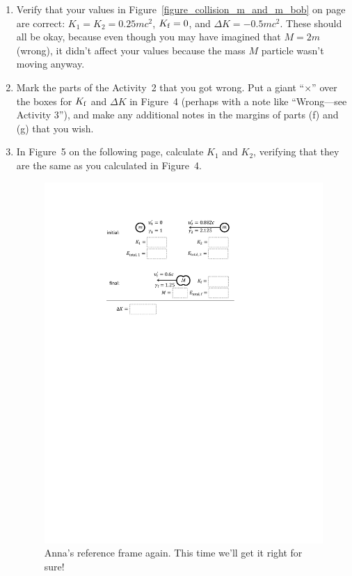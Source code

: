\begin{enumerate}[labparts]

\item Verify that your values in Figure~\ref{figure_collision_m_and_m_bob} on page~\pageref{figure_collision_m_and_m_bob} are correct: $K_1=K_2=0.25mc^2$, $K_{\rm f}=0$, and $\Delta K = -0.5mc^2$.  These should all be okay, because even though you may have imagined that $M=2m$ (wrong), it didn't affect your values because the mass $M$ particle wasn't moving anyway.


\item Mark the parts of the Activity~2 that you got wrong.  Put a giant ``{\Large {$\times$}}'' over the boxes for $K_{\rm f}$ and $\Delta K$ in Figure~4 (perhaps with a note like ``Wrong---see Activity 3''), and make any additional notes in the margins of parts (f) and (g) that you wish.


\item In Figure~5 on the following page, calculate $K_1$ and $K_2$, verifying that they are the same as you calculated in Figure~4. 
\answerspace{0.6in}

\begin{figure}[t]
\begin{center}
\includegraphics{energy_mass/collision_m_and_m_anna_final.pdf}
\caption{Anna's reference frame again.  This time we'll get it right for sure!}
\end{center}
\end{figure}



\end{enumerate}
